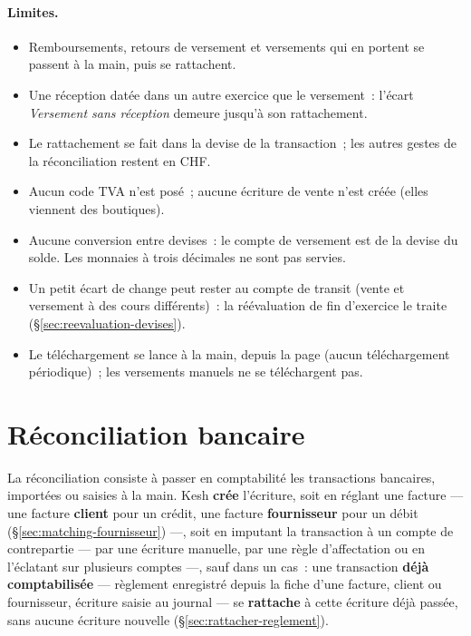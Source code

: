 \documentclass[a4paper,11pt,oneside]{article}
\begin{document}
\paragraph{Limites.}
\begin{itemize}
    \item Remboursements, retours de versement et versements qui en portent se passent à la main, puis se rattachent.
    \item Une réception datée dans un autre exercice que le versement~: l'écart \emph{Versement sans réception} demeure jusqu'à son rattachement.
    \item Le rattachement se fait dans la devise de la transaction~; les autres gestes de la réconciliation restent en CHF.
    \item Aucun code TVA n'est posé~; aucune écriture de vente n'est créée (elles viennent des boutiques).
    \item Aucune conversion entre devises~: le compte de versement est de la devise du solde. Les monnaies à trois décimales ne sont pas servies.
    \item Un petit écart de change peut rester au compte de transit (vente et versement à des cours différents)~: la réévaluation de fin d'exercice le traite (\S\ref{sec:reevaluation-devises}).
    \item Le téléchargement se lance à la main, depuis la page (aucun téléchargement périodique)~; les versements manuels ne se téléchargent pas.
\end{itemize}

\section{Réconciliation bancaire}\label{sec:reconciliation}

La réconciliation consiste à passer en comptabilité les transactions bancaires, importées ou saisies à la main. Kesh \textbf{crée} l'écriture, soit en réglant une facture --- une facture \textbf{client} pour un crédit, une facture \textbf{fournisseur} pour un débit (\S\ref{sec:matching-fournisseur}) ---, soit en imputant la transaction à un compte de contrepartie --- par une écriture manuelle, par une règle d'affectation ou en l'éclatant sur plusieurs comptes ---, sauf dans un cas~: une transaction \textbf{déjà comptabilisée} --- règlement enregistré depuis la fiche d'une facture, client ou fournisseur, écriture saisie au journal --- se \textbf{rattache} à cette écriture déjà passée, sans aucune écriture nouvelle (\S\ref{sec:rattacher-reglement}).
\end{document}
